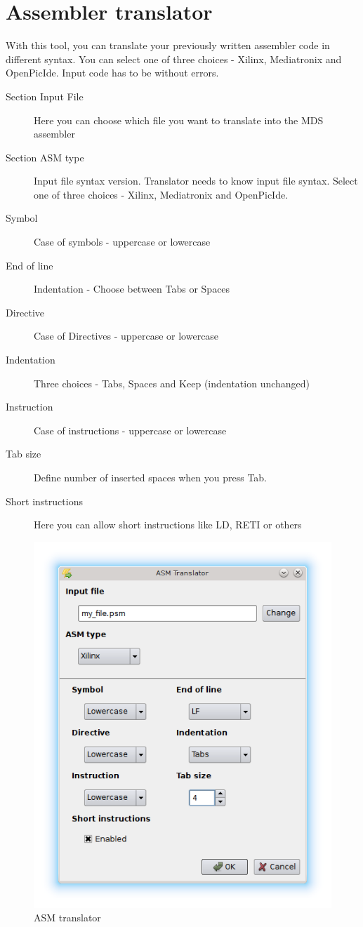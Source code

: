 \section{Assembler translator}
    With this tool, you can translate your previously written assembler code in different syntax.
    You can select one of three choices - Xilinx, Mediatronix and OpenPicIde. Input code has to be without
    errors.
    \begin{description}
        \item[Section Input File] Here you can choose which file you want to translate into the MDS assembler
        \item[Section ASM type] Input file syntax version. Translator needs to know input file syntax. Select one of
             three choices - Xilinx, Mediatronix and OpenPicIde.
        \item[Symbol] Case of symbols - uppercase or lowercase
        \item[End of line] Indentation - Choose between Tabs or Spaces
        \item[Directive] Case of Directives - uppercase or lowercase
        \item[Indentation] Three choices - Tabs, Spaces and Keep (indentation unchanged)
        \item[Instruction] Case of instructions - uppercase or lowercase
        \item[Tab size]  Define number of inserted spaces when you press Tab.
        \item[Short instructions] Here you can allow short instructions like LD, RETI or others
    \end{description}

    \begin{figure}[h]
        \centering{}
        \includegraphics[width=.5\textwidth]{img/ASM_translator.png}
        \caption{ASM translator}
    \end{figure}

